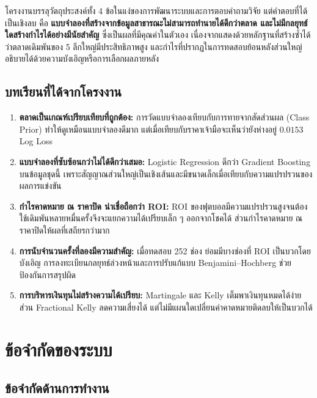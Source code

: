 โครงงานบรรลุวัตถุประสงค์ทั้ง 4 ข้อในแง่ของการพัฒนาระบบและการตอบคำถามวิจัย แต่คำตอบที่ได้เป็นเชิงลบ คือ \textbf{แบบจำลองที่สร้างจากข้อมูลสาธารณะไม่สามารถทำนายได้ดีกว่าตลาด และไม่มีกลยุทธ์ใดสร้างกำไรได้อย่างมีนัยสำคัญ} ซึ่งเป็นผลที่มีคุณค่าในตัวเอง เนื่องจากแสดงด้วยหลักฐานที่สร้างซ้ำได้ว่าตลาดเดิมพันของ 5 ลีกใหญ่มีประสิทธิภาพสูง และกำไรที่ปรากฏในการทดสอบย้อนหลังส่วนใหญ่อธิบายได้ด้วยความบังเอิญหรือการเลือกผลภายหลัง

\subsection{บทเรียนที่ได้จากโครงงาน}

\begin{enumerate}[label=\arabic*)]
    \item \textbf{ตลาดเป็นเกณฑ์เปรียบเทียบที่ถูกต้อง:} การวัดแบบจำลองเทียบกับการทายจากสัดส่วนผล (Class Prior) ทำให้ดูเหมือนแบบจำลองดีมาก แต่เมื่อเทียบกับราคาเจ้ามือจะเห็นว่ายังห่างอยู่ $0.0153$ Log Loss
    \item \textbf{แบบจำลองที่ซับซ้อนกว่าไม่ได้ดีกว่าเสมอ:} Logistic Regression ดีกว่า Gradient Boosting บนข้อมูลชุดนี้ เพราะสัญญาณส่วนใหญ่เป็นเชิงเส้นและมีขนาดเล็กเมื่อเทียบกับความแปรปรวนของผลการแข่งขัน
    \item \textbf{กำไรคาดหมาย ณ ราคาปิด น่าเชื่อถือกว่า ROI:} ROI ของฟุตบอลมีความแปรปรวนสูงจนต้องใช้เดิมพันหลายหมื่นครั้งจึงจะแยกความได้เปรียบเล็ก ๆ ออกจากโชคได้ ส่วนกำไรคาดหมาย ณ ราคาปิดให้ผลที่เสถียรกว่ามาก
    \item \textbf{การนับจำนวนครั้งที่ลองมีความสำคัญ:} เมื่อทดสอบ 252 ช่อง ย่อมมีบางช่องที่ ROI เป็นบวกโดยบังเอิญ การลงทะเบียนกลยุทธ์ล่วงหน้าและการปรับแก้แบบ Benjamini--Hochberg ช่วยป้องกันการสรุปผิด
    \item \textbf{การบริหารเงินทุนไม่สร้างความได้เปรียบ:} Martingale และ Kelly เต็มพาเงินทุนหมดได้ง่าย ส่วน Fractional Kelly ลดความเสี่ยงได้ แต่ไม่มีแผนใดเปลี่ยนค่าคาดหมายติดลบให้เป็นบวกได้
\end{enumerate}

\section{ข้อจำกัดของระบบ}

\subsection{ข้อจำกัดด้านการทำงาน}

